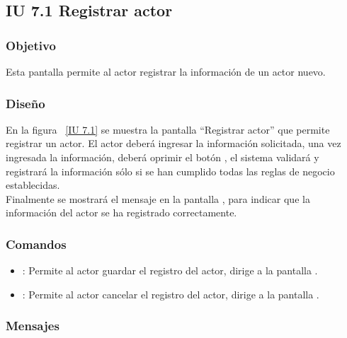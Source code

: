 \subsection{IU 7.1 Registrar actor}

\subsubsection{Objetivo}
	
	Esta pantalla permite al actor registrar la información de un actor nuevo.

\subsubsection{Diseño}

    En la figura ~\ref{IU 7.1} se muestra la pantalla ``Registrar actor'' que permite registrar un actor. El actor deberá ingresar la información solicitada, 
    una vez ingresada la información, deberá oprimir el botón 
    , el sistema validará y registrará la información sólo si se han cumplido todas las reglas de negocio establecidas.  \\
    
    Finalmente se mostrará el mensaje  en la pantalla , para indicar que la información del actor
    se ha registrado correctamente.        



\subsubsection{Comandos}
\begin{itemize}
	\item {}: Permite al actor guardar el registro del actor, dirige a la pantalla .
	\item {}: Permite al actor cancelar el registro del actor, dirige a la pantalla .
\end{itemize}

\subsubsection{Mensajes}

